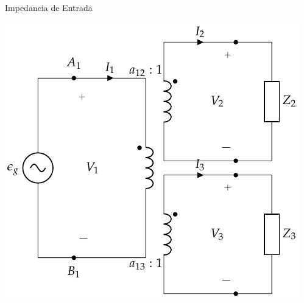\documentclass[xcolor={usenames,svgnames,dvipsnames}]{beamer}
\begin{document}
\begin{frame}[label={sec:org054798d}]{Impedancia de Entrada}
\begin{center}
\includegraphics[height=0.9\textheight]{../figs/TrafoIdealVariosDevanados_Impedancia.pdf}
\end{center}
\end{frame}
\end{document}
